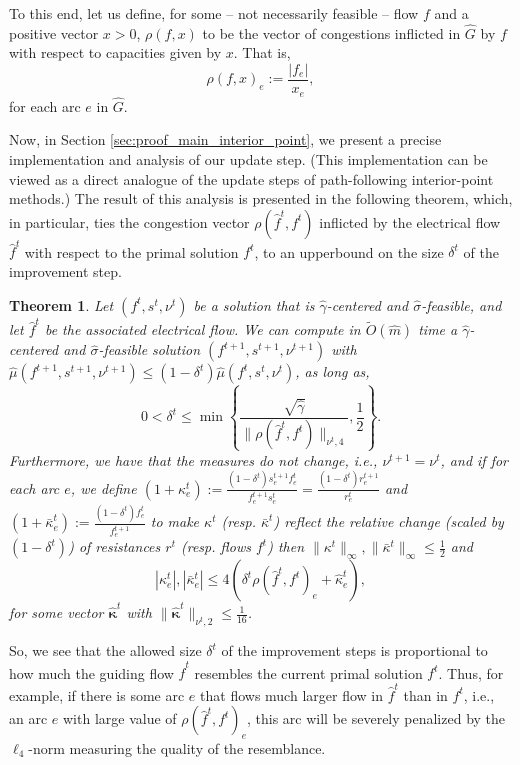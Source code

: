 \documentclass[11pt, letterpaper]{article}
\newtheorem{theorem}{Theorem}[section]
\newcommand{\norm}[2]{\|#1\|_{#2}}
\newcommand{\inorm}[1]{\|#1\|_{\infty}}
\newcommand{\tO}[1]{\widetilde{O}(#1)}
\newcommand{\hG}{\widehat{G}}
\newcommand{\hm}{\widehat{m}}
\newcommand{\hgamma}{\hat{\gamma}}
\newcommand{\okappa}{\bar{\kappa}}
\newcommand{\hkappa}{\hat{\kappa}}
\newcommand{\vrho}{\boldsymbol{\mathit{\rho}}}
\newcommand{\vnu}{\boldsymbol{\mathit{\nu}}}
\newcommand{\hvmu}{\boldsymbol{\mathit{\hat{\mu}}}}
\newcommand{\hvsigma}{\boldsymbol{\mathit{\hat{\sigma}}}}
\newcommand{\vkappa}{\boldsymbol{\mathit{{\kappa}}}}
\newcommand{\ovkappa}{\boldsymbol{\mathit{\bar{\kappa}}}}
\newcommand{\hvkappa}{\boldsymbol{\hat{\kappa}}}
\newcommand{\ff}{\boldsymbol{\mathit{f}}}
\newcommand{\hff}{\boldsymbol{\mathit{\hat{f}}}}
\newcommand{\rr}{\boldsymbol{\mathit{r}}}
\renewcommand{\ss}{\boldsymbol{\mathit{s}}}
\newcommand{\xx}{\boldsymbol{\mathit{x}}}
\begin{document}
To this end, let us define, for some -- not necessarily feasible -- flow $\ff$ and a positive vector $\xx>0$, $\vrho(\ff,\xx)$ to be the vector of congestions inflicted in $\hG$ by $\ff$ with respect to capacities given by $\xx$.  That is, 
\begin{equation}
\label{eq:def_of_rho}
\rho(\ff,\xx)_e:=\frac{|f_e|}{x_e},
\end{equation}
for each arc $e$ in $\hG$. 

Now, in Section \ref{sec:proof_main_interior_point}, we present a precise implementation and analysis of our update step. (This implementation can be viewed as a direct analogue of the update steps of path-following interior-point methods.) The result of this analysis is presented in the following theorem, which, in particular, ties the congestion vector $\vrho(\hff^t,\ff^t)$ inflicted by the electrical flow $\hff^t$ with respect to the primal solution $\ff^t$, to an upperbound on the size $\delta^t$ of the improvement step. 

\begin{theorem}
\label{thm:main_interior_point}
Let $(\ff^t,\ss^t,\vnu^t)$ be a solution that is $\hgamma$-centered and $\hvsigma$-feasible, and let $\hff^t$ be the associated electrical flow. We can compute in $\tO{\hm}$ time a $\hgamma$-centered and $\hvsigma$-feasible solution $(\ff^{t+1},\ss^{t+1},\vnu^{t+1})$ with $\hvmu(\ff^{t+1},\ss^{t+1},\vnu^{t+1})\leq (1-\delta^t) \hvmu(\ff^{t},\ss^{t},\vnu^{t})$, as long as, 
\[
0<\delta^t\leq \min\left\lbrace \frac{\sqrt{\hgamma}}{\norm{\vrho(\hff^t,\ff^t)}{\vnu^t,4}},\frac{1}{2}\right\rbrace.
\]
Furthermore, we have that the measures do not change, i.e., $\vnu^{t+1}=\vnu^t$, and if for each arc $e$, we define $(1+\kappa^t_e):=\frac{(1-\delta^t)s_e^{t+1}f_e^{t}}{f_e^{t+1}s_e^t }=\frac{(1-\delta^t)r_e^{t+1}}{r_e^t}$ and $(1+\okappa^t_e):=\frac{(1-\delta^t)f_e^{t}}{f_e^{t+1}}$ to make $\vkappa^t$ (resp. $\ovkappa^t$) reflect the relative change (scaled by $(1-\delta^t)$) of resistances $\rr^t$ (resp. flows $\ff^t$) then $\inorm{\vkappa^t},\inorm{\ovkappa^t}\leq \frac{1}{2}$ and
\[
|\kappa_e^t|,|\okappa_e^t| \leq 4 (\delta^t\rho(\hff^t,\ff^t)_e + \hkappa^t_e),
\]
for some vector $\hvkappa^t$ with $\norm{\hvkappa^t}{\vnu^t,2}\leq \frac{1}{16}$.
\end{theorem} 

So, we see that the allowed size $\delta^t$ of the improvement steps is proportional to how much the guiding flow $\hff^t$ resembles the current primal solution $\ff^t$. Thus, for example, if there is some arc $e$ that flows much larger flow in $\hff^t$ than in $\ff^t$, i.e., an arc $e$ with large value of $\rho(\hff^t,\ff^t)_e$, this arc will be severely penalized by the $\ell_4$-norm measuring the quality of the resemblance. 
\end{document}
